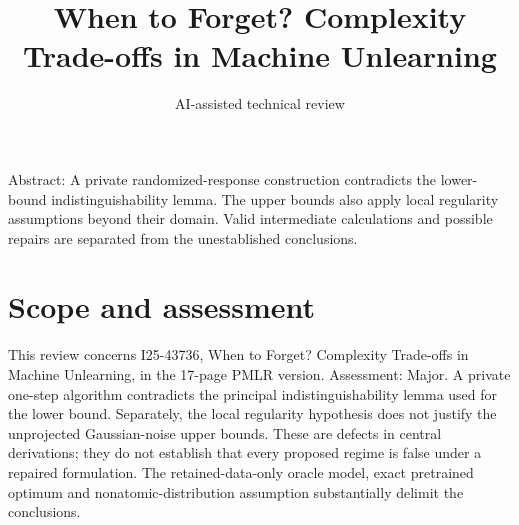 \documentclass[10pt]{article}
\title{When to Forget? Complexity Trade-offs in Machine Unlearning}
\author{AI-assisted technical review}
\date{}
\begin{document}
\maketitle
Abstract: A private randomized-response construction contradicts the lower-bound indistinguishability lemma. The upper bounds also apply local regularity assumptions beyond their domain. Valid intermediate calculations and possible repairs are separated from the unestablished conclusions.\par
\section*{Scope and assessment}
This review concerns I25-43736, When to Forget? Complexity Trade-offs in Machine Unlearning, in the 17-page PMLR version. Assessment: Major. A private one-step algorithm contradicts the principal indistinguishability lemma used for the lower bound. Separately, the local regularity hypothesis does not justify the unprojected Gaussian-noise upper bounds. These are defects in central derivations; they do not establish that every proposed regime is false under a repaired formulation. The retained-data-only oracle model, exact pretrained optimum and nonatomic-distribution assumption substantially delimit the conclusions.\par
\end{document}
